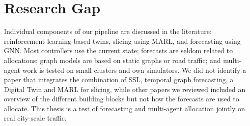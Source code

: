 \section{Research Gap}
Individual components of our pipeline are discussed in the literature: reinforcement learning-based twins, slicing using MARL, and forecasting using GNN. Most controllers use the current state; forecasts are seldom related to allocations; graph models are based on static graphs or road traffic; and multi-agent work is tested on small clusters and own simulators. We did not identify a paper that integrates the combination of SSL, temporal graph forecasting, a Digital Twin and MARL for slicing, while other papers we reviewed included an overview of the different building blocks but not how the forecasts are used to allocate. This thesis is a test of forecasting and multi-agent allocation jointly on real city-scale traffic.